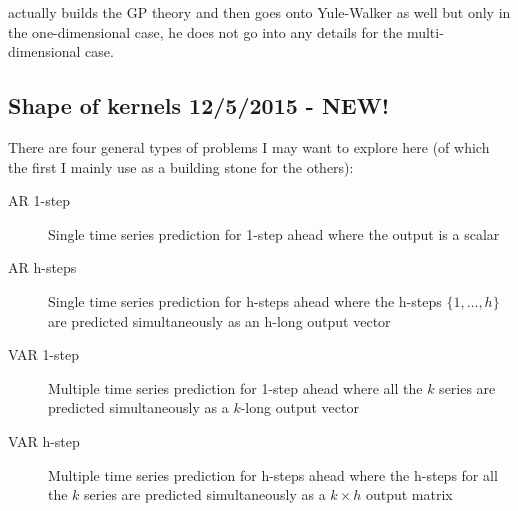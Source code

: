 \documentclass[a4paper]{article}
\begin{document}
\cite{Turner2012} actually builds the GP theory and then goes onto Yule-Walker as well but only in the one-dimensional case, he does not go into any details for the multi-dimensional case.

\subsection{Shape of kernels 12/5/2015 - NEW!}

There are four general types of problems I may want to explore here (of which the first I mainly use as a building stone for the others):
\begin{description}
\item[AR 1-step] Single time series prediction for 1-step ahead where the output is a scalar
\item[AR h-steps] Single time series prediction for h-steps ahead where the h-steps $\{1,\dots,h\}$ are predicted simultaneously as an h-long output vector
\item[VAR 1-step] Multiple time series prediction for 1-step ahead where all the $k$ series are predicted simultaneously as a $k$-long output vector
\item[VAR h-step] Multiple time series prediction for h-steps ahead where the h-steps for all the $k$ series are predicted simultaneously as a $k \times h$ output matrix
\end{description}
\end{document}
